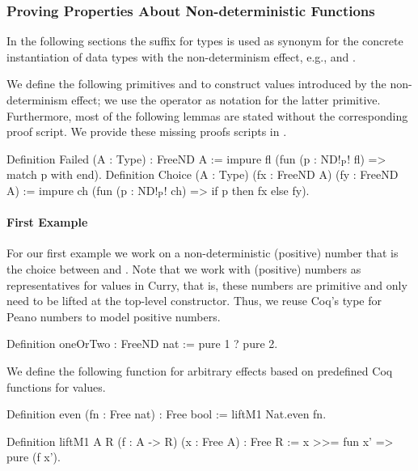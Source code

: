 \subsubsection{Proving Properties About Non\--deterministic Functions}
\label{subsubsec:nondetProving}

In the following sections the suffix  for types is used as synonym for the concrete instantiation of data types with the non\--determinism effect, e.g.,  and .

We define the following primitives  and  to construct values introduced by the non\--determinism effect; we use the operator  as notation for the latter primitive.
Furthermore, most of the following lemmas are stated without the corresponding proof script.
We provide these missing proofs scripts in .

\begin{coqcode}
Definition Failed (A : Type) : FreeND A :=
  impure fl (fun (p : ND!$_\text{P}$! fl) => match p with end).
Definition Choice (A : Type) (fx : FreeND A) (fy : FreeND A) :=
  impure ch (fun (p : ND!$_\text{P}$! ch) => if p then fx else fy).
\end{coqcode}

\paragraph{First Example}
\label{par:firstNDExample}
For our first example we work on a non\--deterministic (positive) number that is the choice between  and .
Note that we work with (positive) numbers as representatives for  values in Curry, that is, these numbers are primitive and only need to be lifted at the top\--level constructor.
Thus, we reuse Coq's type for Peano numbers  to model positive numbers.

\begin{coqcode}
Definition oneOrTwo : FreeND nat :=
  pure 1 ? pure 2.
\end{coqcode}

We define the following function  for arbitrary effects based on predefined Coq functions for  values.

\begin{coqcode}
Definition even (fn : Free nat) : Free bool :=
  liftM1 Nat.even fn.

Definition liftM1 A R (f : A -> R) (x : Free A) : Free R :=
  x >>= fun x' => pure (f x').
\end{coqcode}

